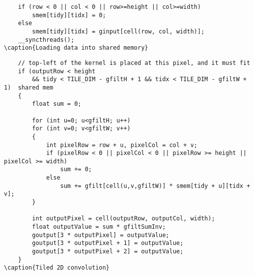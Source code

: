 \documentclass[14pt]{article}
\begin{document}
\begin{lstlisting}
    if (row < 0 || col < 0 || row>=height || col>=width)
        smem[tidy][tidx] = 0;
    else 
        smem[tidy][tidx] = ginput[cell(row, col, width)];
    __syncthreads();
\caption{Loading data into shared memory}
\end{lstlisting}

\begin{lstlisting}
    // top-left of the kernel is placed at this pixel, and it must fit
    if (outputRow < height 
        && tidy < TILE_DIM - gfiltH + 1 && tidx < TILE_DIM - gfiltW + 1)  shared mem 
    {
        float sum = 0;

        for (int u=0; u<gfiltH; u++)
        for (int v=0; v<gfiltW; v++)
        {
            int pixelRow = row + u, pixelCol = col + v;
			if (pixelRow < 0 || pixelCol < 0 || pixelRow >= height || pixelCol >= width) 
				sum += 0;
			else 
				sum += gfilt[cell(u,v,gfiltW)] * smem[tidy + u][tidx + v];
        }
        
        int outputPixel = cell(outputRow, outputCol, width);
        float outputValue = sum * gfiltSumInv;
        goutput[3 * outputPixel] = outputValue;
        goutput[3 * outputPixel + 1] = outputValue;
        goutput[3 * outputPixel + 2] = outputValue;
    }
\caption{Tiled 2D convolution}
\end{lstlisting}
\end{document}
